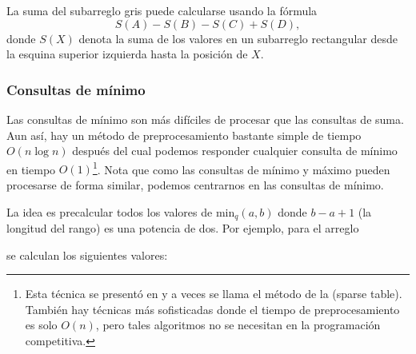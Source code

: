La suma del subarreglo gris puede calcularse
usando la fórmula
\[S(A) - S(B) - S(C) + S(D),\]
donde $S(X)$ denota la suma de los valores
en un subarreglo rectangular
desde la esquina superior izquierda
hasta la posición de $X$.

\subsubsection{Consultas de mínimo}


Las consultas de mínimo son más difíciles de procesar
que las consultas de suma.
Aun así, hay un método de preprocesamiento
bastante simple de tiempo $O(n \log n)$
después del cual podemos responder cualquier consulta
de mínimo en tiempo $O(1)$\footnote{Esta técnica
se presentó en \cite{ben00} y a veces se
llama el método de la  (sparse table).
También hay técnicas más sofisticadas \cite{fis06} donde
el tiempo de preprocesamiento es solo $O(n)$, pero tales algoritmos
no se necesitan en la programación competitiva.}.
Nota que como las consultas de mínimo y máximo pueden
procesarse de forma similar,
podemos centrarnos en las consultas de mínimo.

La idea es precalcular todos los valores de
$\textrm{min}_q(a,b)$ donde
$b-a+1$ (la longitud del rango) es una potencia de dos.
Por ejemplo, para el arreglo

\begin{center}
\end{center}
se calculan los siguientes valores:

